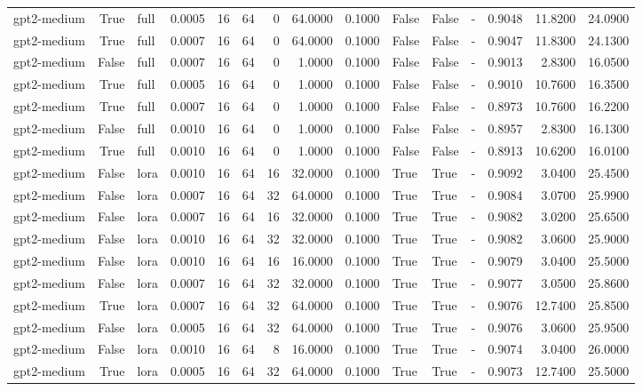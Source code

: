 \begin{tabular}{lrlrrrrrrlllrrr}
gpt2-medium & True & full & 0.0005 & 16 & 64 & 0 & 64.0000 & 0.1000 & False & False & - & 0.9048 & 11.8200 & 24.0900 \\
gpt2-medium & True & full & 0.0007 & 16 & 64 & 0 & 64.0000 & 0.1000 & False & False & - & 0.9047 & 11.8300 & 24.1300 \\
gpt2-medium & False & full & 0.0007 & 16 & 64 & 0 & 1.0000 & 0.1000 & False & False & - & 0.9013 & 2.8300 & 16.0500 \\
gpt2-medium & True & full & 0.0005 & 16 & 64 & 0 & 1.0000 & 0.1000 & False & False & - & 0.9010 & 10.7600 & 16.3500 \\
gpt2-medium & True & full & 0.0007 & 16 & 64 & 0 & 1.0000 & 0.1000 & False & False & - & 0.8973 & 10.7600 & 16.2200 \\
gpt2-medium & False & full & 0.0010 & 16 & 64 & 0 & 1.0000 & 0.1000 & False & False & - & 0.8957 & 2.8300 & 16.1300 \\
gpt2-medium & True & full & 0.0010 & 16 & 64 & 0 & 1.0000 & 0.1000 & False & False & - & 0.8913 & 10.6200 & 16.0100 \\
gpt2-medium & False & lora & 0.0010 & 16 & 64 & 16 & 32.0000 & 0.1000 & True & True & - & 0.9092 & 3.0400 & 25.4500 \\
gpt2-medium & False & lora & 0.0007 & 16 & 64 & 32 & 64.0000 & 0.1000 & True & True & - & 0.9084 & 3.0700 & 25.9900 \\
gpt2-medium & False & lora & 0.0007 & 16 & 64 & 16 & 32.0000 & 0.1000 & True & True & - & 0.9082 & 3.0200 & 25.6500 \\
gpt2-medium & False & lora & 0.0010 & 16 & 64 & 32 & 32.0000 & 0.1000 & True & True & - & 0.9082 & 3.0600 & 25.9000 \\
gpt2-medium & False & lora & 0.0010 & 16 & 64 & 16 & 16.0000 & 0.1000 & True & True & - & 0.9079 & 3.0400 & 25.5000 \\
gpt2-medium & False & lora & 0.0007 & 16 & 64 & 32 & 32.0000 & 0.1000 & True & True & - & 0.9077 & 3.0500 & 25.8600 \\
gpt2-medium & True & lora & 0.0007 & 16 & 64 & 32 & 64.0000 & 0.1000 & True & True & - & 0.9076 & 12.7400 & 25.8500 \\
gpt2-medium & False & lora & 0.0005 & 16 & 64 & 32 & 64.0000 & 0.1000 & True & True & - & 0.9076 & 3.0600 & 25.9500 \\
gpt2-medium & False & lora & 0.0010 & 16 & 64 & 8 & 16.0000 & 0.1000 & True & True & - & 0.9074 & 3.0400 & 26.0000 \\
gpt2-medium & True & lora & 0.0005 & 16 & 64 & 32 & 64.0000 & 0.1000 & True & True & - & 0.9073 & 12.7400 & 25.5000 \\

\end{tabular}
